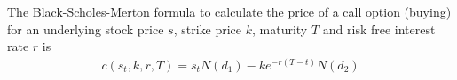 \documentclass[11pt, onecolumn]{article}
\begin{document}
 
The Black-Scholes-Merton formula to calculate the price of a call option (buying) for an underlying stock  price $s$, strike price $k$, maturity $T$ and risk free interest rate $r$ is 
\begin{equation}
\begin{split}
 c(s_t,k,r,T)  = s_t N(d_1) - k e^{-r(T-t)}N(d_2)
 \end{split}
  \label{eq:bsmcall}
\end{equation}
 
\end{document}
